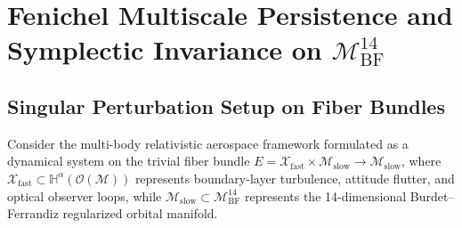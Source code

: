 \documentclass[11pt,a4paper,reqno]{article}
\theoremstyle{plain}
\theoremstyle{definition}
\theoremstyle{remark}
\numberwithin{equation}{section}
\begin{document}
\section{Fenichel Multiscale Persistence and Symplectic Invariance on \texorpdfstring{$\mathcal{M}_{\mathrm{BF}}^{14}$}{M BF 14}}
\label{sec:fenichel_persistence}

\subsection{Singular Perturbation Setup on Fiber Bundles}
Consider the multi-body relativistic aerospace framework formulated as a dynamical system on the trivial fiber bundle $E = \mathcal{X}_{\mathrm{fast}} \times \mathcal{M}_{\mathrm{slow}} \to \mathcal{M}_{\mathrm{slow}}$, where $\mathcal{X}_{\mathrm{fast}} \subset \mathbb{H}^\alpha(\mathcal{O}(\mathcal{M}))$ represents boundary-layer turbulence, attitude flutter, and optical observer loops, while $\mathcal{M}_{\mathrm{slow}} \subset \mathcal{M}_{\mathrm{BF}}^{14}$ represents the 14-dimensional Burdet--Ferrandiz regularized orbital manifold.
\end{document}
